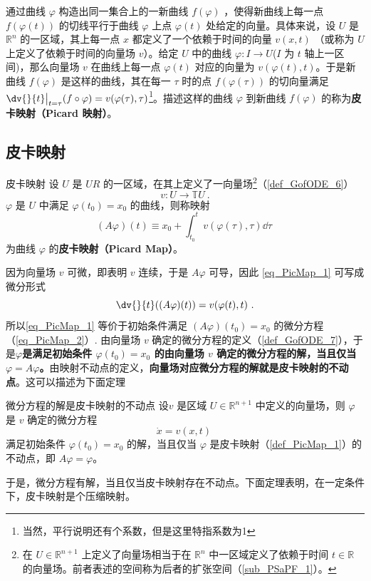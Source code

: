 
\cite{Arnold}通过曲线 $\varphi$ 构造出同一集合上的一新曲线 $f(\varphi)$ ，使得新曲线上每一点 $f(\varphi(t))$ 的切线平行于曲线 $\varphi$ 上点 $\varphi(t)$ 处给定的向量。具体来说，设 $U$ 是 $\mathbb R^n$ 的一区域，其上每一点 $x$ 都定义了一个依赖于时间的向量 $v(x,t)$ （或称为 $U$ 上定义了依赖于时间的向量场 $v$）。给定 $U$ 中的曲线 $\varphi:I\rightarrow U$($I$ 为 $t$ 轴上一区间)，那么向量场 $v$ 在曲线上每一点 $\varphi(t)$ 对应的向量为 $v(\varphi(t),t)$。于是新曲线 $f(\varphi)$ 是这样的曲线，其在每一 $\tau$ 时的点 $f(\varphi(\tau))$ 的切向量满足 $\dv{}{t}\big|_{t=\tau}(f\circ \varphi)=v(\varphi(\tau),\tau)$\footnote{当然，平行说明还有个系数，但是这里特指系数为1}。描述这样的曲线 $\varphi$ 到新曲线 $f(\varphi)$ 的称为\textbf{皮卡映射（Picard 映射）}。
\subsection{皮卡映射}
\begin{definition}{皮卡映射}\label{def_PicMap_1}
设 $U$ 是 $UR$ 的一区域，在其上定义了一向量场\footnote{在 $U\in\mathbb R^{n+1}$ 上定义了向量场相当于在 $\mathbb R^n$ 中一区域定义了依赖于时间 $t\in\mathbb R$ 的向量场。前者表述的空间称为后者的扩张空间（\autoref{sub_PSaPF_1}）。}（\autoref{def_GofODE_6}） 
\begin{equation}
v:U\rightarrow\mathbb TU~.
\end{equation}
$\varphi$ 是 $U$ 中满足 $\varphi(t_0)=x_0$ 的曲线，则称映射
\begin{equation}\label{eq_PicMap_1}
(A\varphi)(t)\equiv x_0+\int_{t_0}^{t}v(\varphi(\tau),\tau)\dd \tau~
\end{equation}
为曲线 $\varphi$ 的\textbf{皮卡映射（Picard Map）}。
\end{definition}

因为向量场 $v$ 可微，即表明 $v$ 连续，于是 $A\varphi$ 可导，因此 \autoref{eq_PicMap_1} 可写成微分形式
\begin{equation}\label{eq_PicMap_2}
\dv{}{t}((A\varphi)(t))=v(\varphi(t),t)~.
\end{equation}
所以\autoref{eq_PicMap_1} 等价于初始条件满足 $(A\varphi)(t_0)=x_0$ 的微分方程（\autoref{eq_PicMap_2}）. 由向量场 $v$ 确定的微分方程的定义（\autoref{def_GofODE_7}），于是\textbf{$\varphi$是满足初始条件 $\varphi(t_0)=x_0$ 的由向量场 $v$ 确定的微分方程的解，当且仅当 $\varphi=A\varphi$。}由映射不动点的定义，\textbf{向量场对应微分方程的解就是皮卡映射的不动点}。这可以描述为下面定理
\begin{theorem}{微分方程的解是皮卡映射的不动点}\label{the_PicMap_1}
设$v$ 是区域 $U\in\mathbb R^{n+1}$ 中定义的向量场，则 $\varphi$ 是 $v$ 确定的微分方程
\begin{equation}\label{eq_PicMap_3}
\dot x=v(x,t)~
\end{equation}
满足初始条件 $\varphi(t_0)=x_0$ 的解，当且仅当 $\varphi$ 是皮卡映射（\autoref{def_PicMap_1}）的不动点，即 $A\varphi=\varphi$。
\end{theorem}
于是，微分方程有解，当且仅当皮卡映射存在不动点。下面定理表明，在一定条件下，皮卡映射是个压缩映射。

